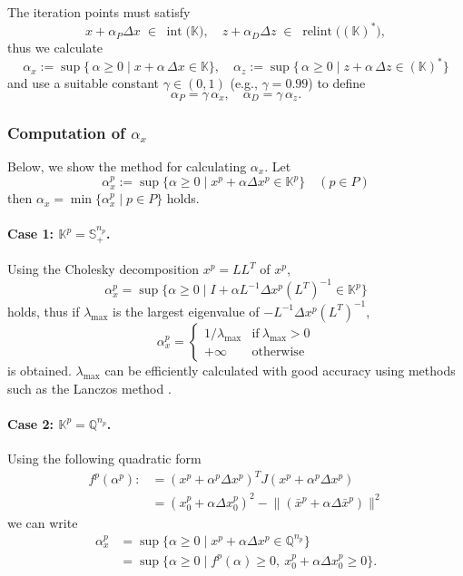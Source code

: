 \documentclass{scrartcl}
\begin{document}
The iteration points must satisfy
\[
  x + \alpha_P \Delta x \;\in\; \operatorname{int}\bigl(\mathbb{K}\bigr),
  \quad
  z + \alpha_D \Delta z \;\in\; \operatorname{relint}\bigl((\mathbb{K})^*\bigr),
\]
thus we calculate
\[
  \alpha_x  := \sup \bigl\{\,\alpha \ge 0 \mid x + \alpha \,\Delta x \in \mathbb{K}\bigr\},
  \quad
  \alpha_z  := \sup \bigl\{\,\alpha \ge 0 \mid z + \alpha \,\Delta z \in (\mathbb{K})^*\bigr\}
\]
and use a suitable constant $\gamma\in(0,1)$ (e.g., $\gamma=0.99$) to define
\[
  \alpha_P 
    = \gamma \,\alpha_x, 
  \quad
  \alpha_D 
    = \gamma \,\alpha_z.
\]

\subsubsection{Computation of $\alpha_x$}
Below, we show the method for calculating $\alpha_x$.  
Let \[\alpha^p_x:=\sup\{\alpha \geq 0 \mid x^p + \alpha \Delta x^p \in \mathbb{K}^p\} \quad (p\in P)\]
then $\alpha_x=\min\{\alpha^p_x\mid p\in P\}$ holds.

\paragraph{Case 1: $\mathbb{K}^p = \mathbb{S}^{n_p}_+$.}

Using the Cholesky decomposition $x^p=LL^T$ of $x^p$,
\[\alpha^p_x = \sup\{\alpha \geq 0 \mid I + \alpha L^{-1} \Delta x^p (L^T)^{-1} \in \mathbb{K}^p\}\]
holds, thus if $\lambda_{\max}$ is the largest eigenvalue of $-L^{-1} \Delta x^p (L^T)^{-1}$,
\[\alpha^p_x = \begin{cases}
    1/\lambda_{\max} & \text{if} ~ \lambda_{\max} > 0 \\
    +\infty & \text{otherwise}
\end{cases}\]
is obtained.
$\lambda_{\max}$ can be efficiently calculated with good accuracy using methods such as the Lanczos method \cite{Golub2013}.

\paragraph{Case 2: $\mathbb{K}^p = \mathbb{Q}^{n_p}$.}

Using the following quadratic form
\begin{align*}
  f^p(\alpha^p)
  :&= ( x^p + \alpha^p \Delta x^p )^T J ( x^p + \alpha^p \Delta x^p )\\
   &=  ( x^p_0 + \alpha \Delta x^p_0 )^2 - \bigl\|( \bar{x}^p + \alpha \Delta \bar{x}^p )\bigr\|^2
\end{align*}
we can write
\begin{align*}
    \alpha_x^p 
    &= \sup\{\alpha \geq 0 \mid x^p + \alpha \Delta x^p \in \mathbb{Q}^{n_p}\}\\
    &= \sup\{\alpha \geq 0 \mid f^p(\alpha) \geq 0, ~x^p_0 + \alpha \Delta x^p_0 \geq 0\}.
\end{align*}
\end{document}
